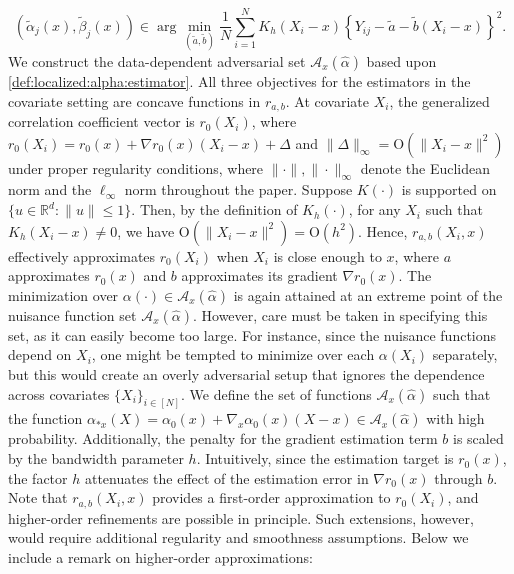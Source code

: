 \documentclass[11pt]{article}
\begin{document}
\begin{equation}\label{def:localized:alpha:estimator}
\left(\tilde{\alpha}_j(x), \tilde{\beta}_j(x)\right)\in \arg\!\min_{(\tilde a,\tilde b)}\frac{1}{N}\!\sum_{i=1}^N\!K_h(X_i-x)\!\left\{Y_{ij} - \tilde a - \tilde b(X_i-x)\right\}^2.
\end{equation} 
We construct the data-dependent adversarial set $\mathcal{A}_x(\hat{\alpha})$ based upon \eqref{def:localized:alpha:estimator}. All three objectives for the estimators in the covariate setting are concave functions in $r_{a,b}$. At covariate $X_i$, the generalized correlation coefficient vector is $r_0(X_i)$, where $r_0(X_i)=r_0(x)+\nabla r_0(x)(X_i-x)+\Delta$ and $\|\Delta\|_{\infty}=\mathrm{O}\left(\|X_i-x\|^2\right)$ under proper regularity conditions, where $\|\cdot\|, \|\cdot\|_\infty$ denote the Euclidean norm and the $\ell_\infty$ norm throughout the paper. Suppose $K(\cdot)$ is supported on $\{u\in\mathbb{R}^d:\|u\|\le1\}$. Then, by the definition of $K_h(\cdot)$, for any $X_i$ such that $K_h(X_i-x)\neq0$, we have $\mathrm{O}\left(\|X_i-x\|^2\right)=\mathrm{O}(h^2)$. Hence, $r_{a,b}(X_i,x)$ effectively approximates $r_0(X_i)$ when $X_i$ is close enough to $x$, where $a$ approximates $r_0(x)$ and $b$ approximates its gradient $\nabla r_0(x)$. The minimization over $\alpha(\cdot) \in \mathcal{A}_x(\hat{\alpha})$ is again attained at an extreme point of the nuisance function set $\mathcal{A}_x(\hat{\alpha})$. However, care must be taken in specifying this set, as it can easily become too large. For instance, since the nuisance functions depend on $X_i$, one might be tempted to minimize over each $\alpha(X_i)$ separately, but this would create an overly adversarial setup that ignores the dependence across covariates $\{X_i\}_{i\in[N]}$. We define the set of functions $\mathcal{A}_x(\hat\alpha)$ such that the function $\alpha_{*x}(X)=\alpha_0(x)+\nabla_x\alpha_0(x)(X-x) \in \mathcal{A}_x(\hat\alpha)$ with high probability. Additionally, the penalty for the gradient estimation term $b$ is scaled by the bandwidth parameter $h$. Intuitively, since the estimation target is $r_0(x)$, the factor $h$ attenuates the effect of the estimation error in $\nabla r_0(x)$ through $b$. Note that $r_{a,b}(X_i,x)$ provides a first-order approximation to $r_0(X_i)$, and higher-order refinements are possible in principle. Such extensions, however, would require additional regularity and smoothness assumptions. Below we include a remark on higher-order approximations:
\end{document}
